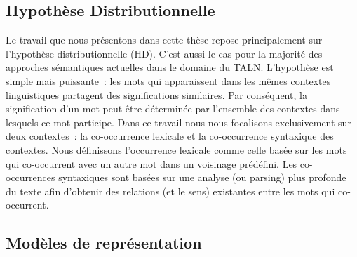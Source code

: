 \documentclass[a4paper,11pt,twoside]{article}
\begin{document}
\subsection{Hypothèse Distributionnelle}
Le travail que nous présentons dans cette thèse repose principalement sur l'hypothèse distributionnelle (HD)\cite{harris1954}. C'est aussi le cas pour la majorité des approches sémantiques actuelles dans le domaine du TALN. L'hypothèse est simple mais puissante~: les mots qui apparaissent dans les mêmes contextes linguistiques partagent des significations similaires. Par conséquent, la signification d'un mot peut être déterminée par l'ensemble des contextes dans lesquels ce mot participe. 
%
Dans ce travail nous nous focalisons exclusivement sur deux contextes~: la co-occurrence lexicale et la co-occurrence syntaxique des contextes. Nous définissons l'occurrence lexicale comme celle basée sur les mots qui co-occurrent avec un autre mot dans un voisinage prédéfini. Les co-occurrences syntaxiques sont basées sur une analyse (ou parsing) plus profonde du texte afin d'obtenir des relations (et le sens) existantes entre les mots qui co-occurrent.


%

\subsection{Modèles de représentation}
\end{document}
